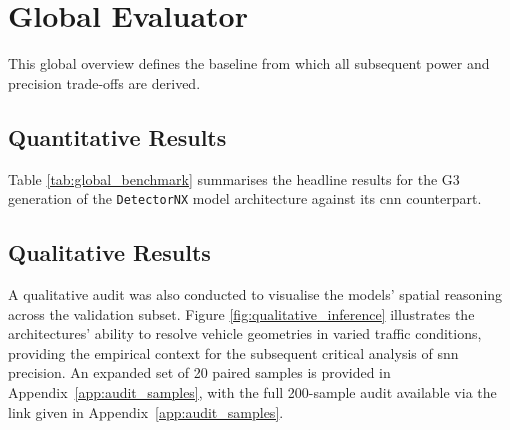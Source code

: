 \section{Global Evaluator}

This global overview defines the baseline from which all subsequent power and precision trade-offs are derived.

\subsection*{Quantitative Results}
Table \ref{tab:global_benchmark} summarises the headline results for the G3 generation of the \texttt{DetectorNX} model architecture against its \gls{cnn} counterpart.

\begin{table}[H]
\centering
{}
\caption{Global Performance Benchmark results for \texttt{DetectorNX-G3-SNN} and \texttt{DetectorNX-G3-CNN}, evaluated across the full 200-sample ETraM validation set \parencite{Verma_2024_CVPR}. Ground truth average detections per frame is 2.02 for both models by definition.}
\label{tab:global_benchmark}
\end{table}

\subsection*{Qualitative Results}

A qualitative audit was also conducted to visualise the models' spatial reasoning across the validation subset. Figure \ref{fig:qualitative_inference} illustrates the architectures' ability to resolve vehicle geometries in varied traffic conditions, providing the empirical context for the subsequent critical analysis of \gls{snn} precision. An expanded set of 20 paired samples is provided in Appendix~\ref{app:audit_samples}, with the full 200-sample audit available via the link given in Appendix~\ref{app:audit_samples}.

